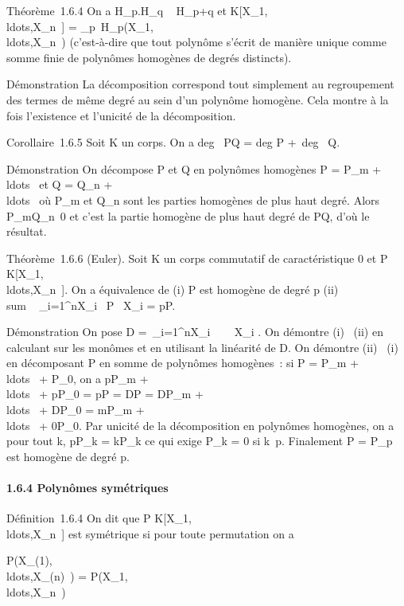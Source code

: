 Théorème~1.6.4 On a H_p.H_q \subset~ H_p+q et
K{[}X_1,\\ldots,X_n~{]}
=
\oplus_p\in{}~H_p(X_1,\\ldots,X_n~)
(c'est-à-dire que tout polynôme s'écrit de manière unique comme somme
finie de polynômes homogènes de degrés distincts).

Démonstration La décomposition correspond tout simplement au
regroupement des termes de même degré au sein d'un polynôme homogène.
Cela montre à la fois l'existence et l'unicité de la décomposition.

Corollaire~1.6.5 Soit K un corps. On a deg~ PQ
= deg P +\ deg~ Q.

Démonstration On décompose P et Q en polynômes homogènes P =
P_m +
\\ldots~ et Q =
Q_n +
\\ldots~ où
P_m et Q_n sont les parties homogènes de plus haut
degré. Alors P_mQ_n\neq~0 et
c'est la partie homogène de plus haut degré de PQ, d'où le résultat.

Théorème~1.6.6 (Euler). Soit K un corps commutatif de caractéristique 0
et P \in
K{[}X_1,\\ldots,X_n~{]}.
On a équivalence de (i) P est homogène de degré p (ii)
\\sum ~
_i=1^nX_i \partial~P \over
\partial~X_i = pP.

Démonstration On pose D =\
\sum  _i=1^nX_i~ \partial~
\over \partial~X_i . On démontre (i) \rigtharrow~(ii) en
calculant sur les monômes et en utilisant la linéarité de D. On démontre
(ii) \rigtharrow~(i) en décomposant P en somme de polynômes homogènes~: si P =
P_m +
\\ldots~ +
P_0, on a pP_m +
\\ldots~ +
pP_0 = pP = DP = DP_m +
\\ldots~ +
DP_0 = mP_m +
\\ldots~ +
0P_0. Par unicité de la décomposition en polynômes homogènes,
on a pour tout k, pP_k = kP_k ce qui exige
P_k = 0 si k\neq~p. Finalement P =
P_p est homogène de degré p.

\paragraph{1.6.4 Polynômes symétriques}

Définition~1.6.4 On dit que P \in
K{[}X_1,\\ldots,X_n~{]}
est symétrique si pour toute permutation \sigma on a

P(X_\sigma(1),\\ldots,X_\sigma(n)~)
=
P(X_1,\\ldots,X_n~)

